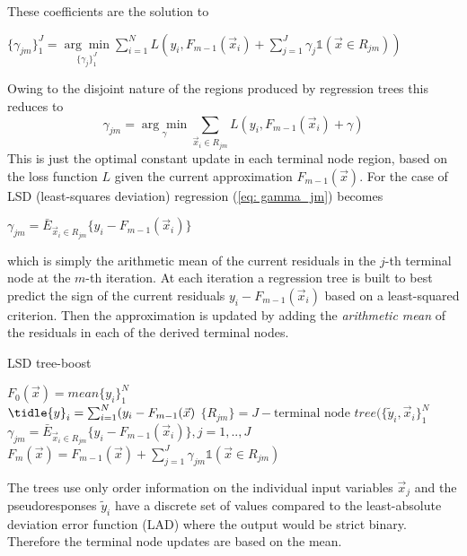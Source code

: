 \documentclass[12pt, a4paper]{article}
\begin{document}
These coefficients are the solution to 
\begin{center}
    $\{\gamma_{jm}\}_1^J = \underset{\{\gamma_j\}_1^J}{\arg\min} \sum_{i=1}^N L\left(y_i,F_{m-1}(\vec{x}_i) + \sum_{j=1}^J \gamma_j \mathds{1}(\vec{x} \in R_{jm})\right)$
\end{center}
Owing to the disjoint nature of the regions produced by regression trees this reduces to
\begin{equation}
        \label{eq: gamma_jm}
        \gamma_{jm} = \underset{\gamma}{\arg\min} \sum_{\vec{x}_i \in R_{jm}} L\left(y_i,F_{m-1}(\vec{x}_i) + \gamma\right)
\end{equation}
This is just the optimal constant update in each terminal node region, based on the loss function $L$ given the current approximation $F_{m-1}(\vec{x})$.
For the case of LSD (least-squares deviation) regression (\ref{eq: gamma_jm}) becomes 
\begin{center}
    $\gamma_{jm} = \bar{E}_{\vec{x}_i \in R_{jm}}\{y_i - F_{m-1}(\vec{x}_i)\}$
\end{center}
which is simply the arithmetic mean of the current residuals in the $j$-th terminal node at the $m$-th iteration. At each iteration a regression tree is built to best predict the sign of the current residuals $y_i - F_{m-1}(\vec{x}_i)$ based on a least-squared criterion. Then the approximation is updated by adding the \textit{arithmetic mean} of the residuals in each of the derived terminal nodes.
\begin{algorithm}
\caption{LSD tree-boost}\label{alg: lsd_tree_boost_algo}
    $F_0(\vec{x}) = mean\{y_i\}_1^N$ \\
    {
    $\tidle{y}_i = \sum_{i=1}^N (y_i - F_{m-1}(\vec{x})$
    $\{R_{jm}\} = J-\text{terminal node } tree(\{\tilde{y}_i,\vec{x}_i\}_1^N$
    $\gamma_{jm} = \bar{E}_{\vec{x}_i \in R_{jm}}\{y_i - F_{m-1}(\vec{x}_i)\} , j = 1,..,J$
    $F_m(\vec{x}) = F_{m-1}(\vec{x}) + \sum_{j=1}^J \gamma_{jm} \mathds{1}(\vec{x} \in R_{jm})$
    }
\end{algorithm}
The trees use only order information on the individual input variables $\vec{x}_j$ and the pseudoresponses $\tilde{y}_i$ have a discrete set of values compared to the least-absolute deviation error function (LAD) where the output would be strict binary. Therefore the terminal node updates are based on the mean.
\newpage
\end{document}

